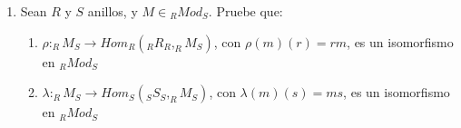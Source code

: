 \documentclass{article}
\newcommand{\lrprth}[1]{
	\left(#1\right)
}
\newcommand{\ringmod}[3]{
	\if#3l
	{}_{#1}#2
	\else
	\if#3r
	#2_{#1}
	\fi
	\fi
}
\newcommand{\ringbimod}[4]{
	\if#4l
	{}_{#1-#2}#3
	\else
	\if#4r
	#3_{#1-#2}
	\else 
	\ifstrequal{#4}{lr}{
		{}_{#1}#3_{#2}
	}
	\fi
	\fi
}
\newcommand{\ringmodhom}[3]{
	Hom_{#1}\lrprth{#2,#3}
}
\theoremstyle{definition}
\theoremstyle{plain}
\theoremstyle{plain}
\theoremstyle{definition}
\theoremstyle{definition}
\theoremstyle{definition}
\theoremstyle{definition}
\theoremstyle{definition}
\theoremstyle{definition}
\begin{document}
\begin{enumerate}[label=\textbf{Ej \arabic*.}]
\begin{proof}
\begin{align*}
		&=f(m)t+f(m)t'\\
		&=f\bullet t(m)+ f\bullet t' (m)\\
		&=\lrprth{f\bullet t+ f\bullet t' }(m).\\
		\implies f\bullet\lrprth{t+t'}&= f\bullet t+ f\bullet t'.\\
		\lrprth{\lrprth{f\bullet t}\bullet t'}(m)&=\lrprth{\lrprth{f\bullet t}(m)}t'\\
		&=\lrprth{f(m)t}t'\\
		&=f(m)\lrprth{tt'} && N\in\ringmod{T}{\text{Mod}}{r}\\
		&=\lrprth{f\bullet\lrprth{tt'}}(m).\\
		\implies \lrprth{f\bullet t}\bullet t'&= f\bullet\lrprth{tt'}.\\
		\lrprth{f\bullet 1_T}(m)&=f(m)1_T\\
		&=f(m) && N\in\ringmod{T}{\text{Mod}}{r}.\\
		\implies f\bullet 1_T&= f.\\
		&\therefore\ H\in\ringmod{T}{\text{Mod}}{r}.\\
		\intertext{Así}
		H&\in\ringmod{S}{\text{Mod}}{l}\cap \ringmod{T}{\text{Mod}}{r}.\\
		\intertext{Finalmente, notemos que}
		\lrprth{\lrprth{s\bullet f}\bullet t}(m)&=\lrprth{\lrprth{s\bullet f}(m)}t\\
		&=f(ms)t\\
		&=\lrprth{f\bullet t}(ms)\\
		&=\lrprth{s\bullet\lrprth{f\bullet t}}(m).\\
		\implies \lrprth{s\bullet f}\bullet t&= s\bullet\lrprth{f\bullet t}.\\
		&\therefore\ H\in\ringbimod{S}{T}{\text{Mod}}{lr}.
	\end{align*} 
	$\boxed{\text{(b)}}$ Es análogo a lo demostrado en (a), empleando ahora las propiedades de los morfismos de $R$-módulos a derecha para verificar que $H'$ es un grupo abeliano con la suma usual de funciones, y que $M\in\ringmod{S}{\text{Mod}}{l}, N\in\ringmod{T}{\text{Mod}}{l}$ para verificar que $H\in\ringbimod{T}{S}{\text{Mod}}{lr}$.
\end{proof}
\item Sean $R$ y $S$ anillos, y $M \in {}_{R}Mod_{S}$. Pruebe que:
\begin{enumerate}
	\item $\rho :_{R}M_{S} \longrightarrow \ringmodhom{R}{_{R}R_{R}}{_{R}M_{S}}$, con $\rho \lrprth{m}\lrprth{r}=rm$, es un isomorfismo en $_{R}Mod_{S}$
	\item $\lambda :_{R}M_{S} \longrightarrow \ringmodhom{S}{_{S}S_{S}}{_{R}M_{S}}$, con $\lambda \lrprth{m}\lrprth{s}=ms$, es un isomorfismo en $_{R}Mod_{S}$

\end{enumerate}
\end{enumerate}
\end{document}
